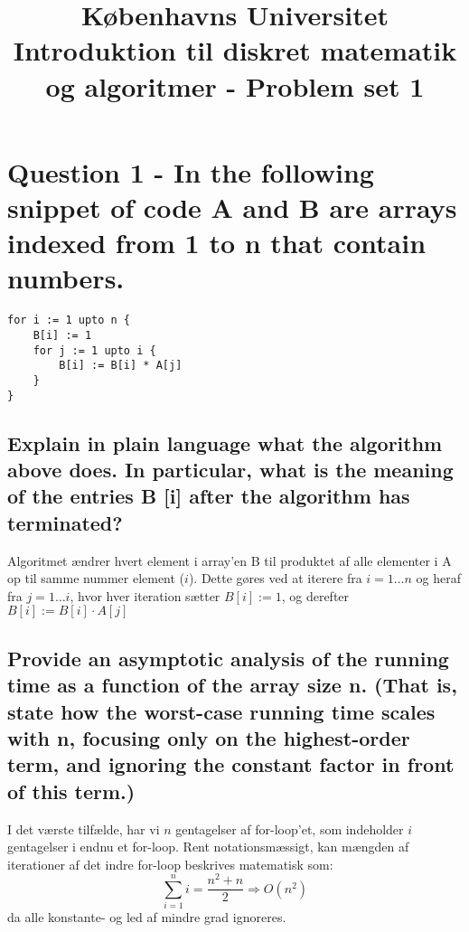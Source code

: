 \documentclass[a4paper,12pt]{article}
\begin{document}
% 

\title{Københavns Universitet\\
Introduktion til diskret matematik og algoritmer - Problem set 1}
\maketitle %

\section[Question 1]{Question 1 - In the following snippet of code A and B are arrays indexed from 1 to n that contain numbers. }

\begin{lstlisting}
for i := 1 upto n { 
    B[i] := 1 
    for j := 1 upto i {
        B[i] := B[i] * A[j] 
    }
} 
\end{lstlisting}

\subsection[]{Explain in plain language what the algorithm above does. In particular, what is the meaning of the entries B [i] after the algorithm has terminated? }

Algoritmet ændrer hvert element i array'en B til produktet af alle elementer i A op til samme nummer element ($i$). Dette gøres ved at iterere fra $i=1\dots n$ og heraf fra $j=1\dots  i$, hvor hver iteration sætter $B[i] := 1$, og derefter $B[i] := B[i] \cdot A[j]$

\subsection[]{Provide an asymptotic analysis of the running time as a function of the array size n. (That is, state how the worst-case running time scales with n, focusing only on the highest-order term, and ignoring the constant factor in front of this term.)}

I det værste tilfælde, har vi $n$ gentagelser af for-loop'et, som indeholder $i$ gentagelser i endnu et for-loop. 
Rent notationsmæssigt, kan mængden af iterationer af det indre for-loop beskrives matematisk som:\\
\[\sum_{i=1}^{n}i=\dfrac{n^2+n}{2} \Rightarrow O(n^2)\]
da alle konstante- og led af mindre grad ignoreres.
\end{document}
